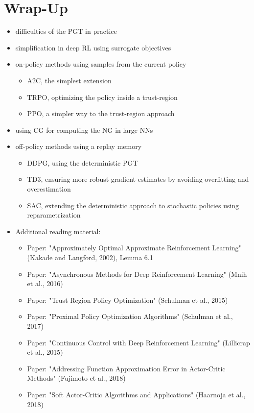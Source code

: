 	\section{Wrap-Up}
		\begin{itemize}
			\item difficulties of the \ac{PGT} in practice
			\item simplification in deep \ac{RL} using surrogate objectives
			\item on-policy methods using samples from the current policy
				\begin{itemize}
					\item \ac{A2C}, the simplest extension
					\item \ac{TRPO}, optimizing the policy inside a trust-region
					\item \ac{PPO}, a simpler way to the trust-region approach
				\end{itemize}
			\item using \ac{CG} for computing the \ac{NG} in large \acp{NN}
			\item off-policy methods using a replay memory
				\begin{itemize}
					\item \ac{DDPG}, using the deterministic \ac{PGT}
					\item \ac{TD3}, ensuring more robust gradient estimates by avoiding overfitting and overestimation
					\item \ac{SAC}, extending the deterministic approach to stochastic policies using reparametrization
				\end{itemize}
			\item Additional reading material:
				\begin{itemize}
					\item Paper: "Approximately Optimal Approximate Reinforcement Learning" (Kakade and Langford, 2002), Lemma 6.1
					\item Paper: "Asynchronous Methods for Deep Reinforcement Learning" (Mnih et al., 2016)
					\item Paper: "Trust Region Policy Optimization" (Schulman et al., 2015)
					\item Paper: "Proximal Policy Optimization Algorithms" (Schulman et al., 2017)
					\item Paper: "Continuous Control with Deep Reinforcement Learning" (Lillicrap et al., 2015)
					\item Paper: "Addressing Function Approximation Error in Actor-Critic Methods" (Fujimoto et al., 2018)
					\item Paper: "Soft Actor-Critic Algorithms and Applications" (Haarnoja et al., 2018)
				\end{itemize}
		\end{itemize}

